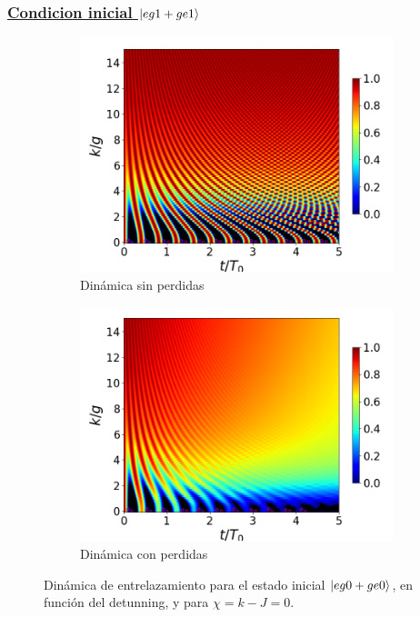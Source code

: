 \subsubsection{\underline{Condicion inicial $\ket{eg1+ge1}$}}
\begin{figure}[h]
    \centering
    \begin{subfigure}{0.49\textwidth}
        \includegraphics[width=\textwidth]{figuras/ch4/concu/k/eg1+ge1 d=0.0g x=0.0g J=0.0g gamma=0.25g concu k uni.png}
        \caption{Dinámica sin perdidas}
        \label{fig4:concu k 1 uni}
    \end{subfigure}
    \hfill
    \begin{subfigure}{0.49\textwidth}
        \includegraphics[width=\textwidth]{figuras/ch4/concu/k/eg1+ge1 d=0.0g x=0.0g J=0.0g gamma=0.25g concu k dis.png}
        \caption{Dinámica con perdidas}
        \label{fig4:concu k 1 dis}
    \end{subfigure}
    \caption{Dinámica de entrelazamiento para el estado inicial $\ket{eg0+ge0}$, en función del detunning, y para $\chi=k-J=0$.}
    \label{fig4:concu k 1}
\end{figure}
